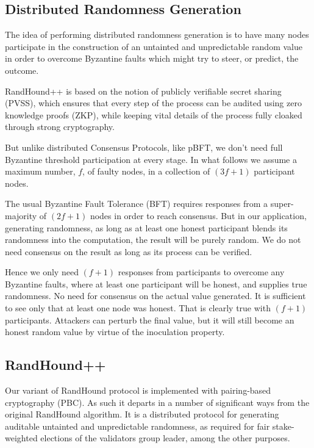 \documentclass[a4paper, 10pt, conference]{ieeeconf}
\begin{document}
\subsection{Distributed Randomness Generation}

The idea of performing distributed randomness generation is to have many nodes participate in the construction of an untainted and unpredictable random value in order to overcome Byzantine faults which might try to steer, or predict, the outcome.

RandHound++ is based on the notion of publicly verifiable secret sharing (PVSS)\cite{c15}, which ensures that every step of the process can be audited using zero knowledge proofs (ZKP), while keeping vital details of the process fully cloaked through strong cryptography.

But unlike distributed Consensus Protocols, like pBFT, we don't need full Byzantine threshold participation at every stage. In what follows we assume a maximum number, $f$, of faulty nodes, in a collection of $(3 f + 1)$ participant nodes. 

The usual Byzantine Fault Tolerance (BFT) requires responses from a super-majority of $(2 f + 1)$ nodes in order to reach consensus. But in our application, generating randomness, as long as at least one honest participant blends its randomness into the computation, the result will be purely random. We do not need consensus on the result as long as its process can be verified.

Hence we only need $(f + 1)$ responses from participants to overcome any Byzantine faults, where at least one participant will be honest, and supplies true randomness. No need for consensus on the actual value generated. It is sufficient to see only that at least one node was honest. That is clearly true with $(f + 1)$ participants. Attackers can perturb the final value, but it will still become an honest random value by virtue of the inoculation property.

\subsection{RandHound++}

Our variant of RandHound protocol is implemented with pairing-based cryptography (PBC). As such it departs in a number of significant ways from the original RandHound algorithm. It is a distributed protocol for generating audit\-able untainted and unpredictable randomness, as required for fair stake-weighted elections of the validators group leader, among the other purposes.
\end{document}
